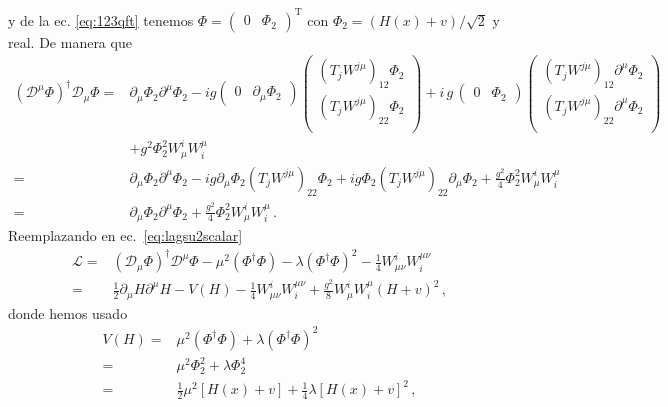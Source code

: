 y de la ec. \eqref{eq:123qft} tenemos $\Phi=
\begin{pmatrix}
  0 & \Phi_2
\end{pmatrix}^{\operatorname{T}}
$ con $\Phi_2=\left( H(x)+v \right)/\sqrt{2}$ y real. De manera que
\begin{align}
   \left( \mathcal{D}^{\mu} \Phi \right)^{\dagger}  \mathcal{D}_{\mu} \Phi
=& \partial_{\mu}\Phi_2 \partial^{\mu}\Phi_2 -ig
   \begin{pmatrix}
      0 & \partial_{\mu}\Phi_2
   \end{pmatrix}
   \begin{pmatrix}
     \left( T_j W^{j\mu} \right)_{12} \Phi_2 \\
         \left( T_j W^{j\mu} \right)_{22} \Phi_2 \\        
    \end{pmatrix}
     +i\,g\,   \begin{pmatrix}
      0 & \Phi_2
   \end{pmatrix}
   \begin{pmatrix}
     \left( T_j W^{j\mu} \right)_{12} \partial^{\mu} \Phi_2 \\
         \left( T_j W^{j\mu} \right)_{22} \partial^{\mu} \Phi_2 \\        
    \end{pmatrix} \nonumber\\
  & +g^2 \Phi_2^2 W^i_{\mu}W^{\mu}_{i} \nonumber\\
 =& \partial_{\mu}\Phi_2 \partial^{\mu}\Phi_2
  -ig \partial_{\mu}\Phi_2 \left( T_j W^{j\mu} \right)_{22} \Phi_2
    +ig \Phi_2 \left( T_j W^{j\mu} \right)_{22}\partial_{\mu} \Phi_2  +\frac{g^2}{4} \Phi_2^2 W^i_{\mu}W^{\mu}_{i} \nonumber\\
 =& \partial_{\mu}\Phi_2 \partial^{\mu}\Phi_2 +\frac{g^2}{4} \Phi_2^2 W^i_{\mu}W^{\mu}_{i}\,.
\end{align}
Reemplazando en ec.~\eqref{eq:lagsu2scalar}
\begin{align}
  \label{eq:su2wwh}
  \mathcal{L}= &\left( \mathcal{D}_{\mu} \Phi\right)^{\dagger}\mathcal{D}^{\mu} \Phi-
                      \mu^2 \left( \Phi^{\dagger} \Phi\right)-\lambda \left( \Phi^{\dagger} \Phi\right)^2
                      -\frac{1}{4}W_{\mu\nu}^{i}W^{\mu\nu}_i \nonumber\\
=&\frac{1}{2} \partial_{\mu} H \partial^{\mu}H -V(H) -\frac{1}{4}W_{\mu\nu}^{i}W^{\mu\nu}_i +\frac{g^2}{8} W^i_{\mu}W^{\mu}_{i}\left( H+v \right)^2\,,
\end{align}
donde hemos usado
\begin{align}
  V(H)=&\mu^2 \left( \Phi^{\dagger} \Phi\right)+\lambda \left( \Phi^{\dagger} \Phi\right)^2 \nonumber\\
  =&\mu^2  \Phi_2^2+\lambda  \Phi_2^4 \nonumber\\
  =&\frac{1}{2}\mu^2 \left[ H(x)+v \right]+\frac{1}{4}\lambda \left[ H(x)+v \right]^2\,,
\end{align}
